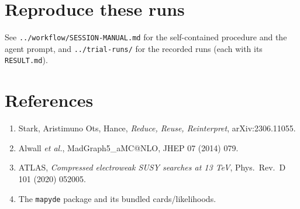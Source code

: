 \documentclass[11pt,oneside]{report}
\newcommand{\code}[1]{\texttt{#1}}
\begin{document}
\chapter{Reproduce these runs}
See \code{../workflow/SESSION-MANUAL.md} for the self-contained procedure and the agent prompt, and
\code{../trial-runs/} for the recorded runs (each with its \code{RESULT.md}).

\chapter{References}
\begin{enumerate}[nosep]
  \item Stark, Aristimuno Ots, Hance, \emph{Reduce, Reuse, Reinterpret}, arXiv:2306.11055.
  \item Alwall \emph{et al.}, MadGraph5\_aMC@NLO, JHEP 07 (2014) 079.
  \item ATLAS, \emph{Compressed electroweak SUSY searches at 13 TeV}, Phys.\ Rev.\ D 101 (2020) 052005.
  \item The \code{mapyde} package and its bundled cards/likelihoods.
\end{enumerate}
\end{document}
